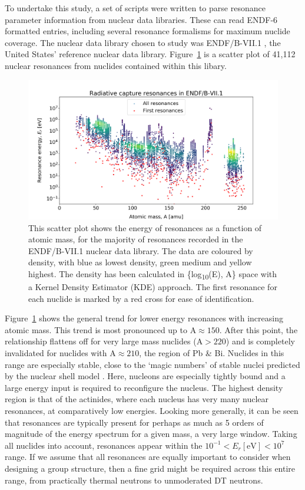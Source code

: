 To undertake this study, a set of scripts were written to parse resonance parameter information from nuclear data libraries. These can read ENDF-6 formatted entries, including several resonance formalisms for maximum nuclide coverage. The nuclear data library chosen to study was ENDF/B-VII.1 \cite{Chadwick2011}, the United States' reference nuclear data library. Figure~\ref{fig:res_energy_mass} is a scatter plot of 41,112 nuclear resonances from nuclides contained within this libary. 

\begin{figure}[H]
  \centering
  \includegraphics[width=\linewidth]{resonance_energy_atomic_mass}
  \caption{This scatter plot shows the energy of resonances as a function of atomic mass, for the majority of resonances recorded in the ENDF/B-VII.1 nuclear data library. The data are coloured by density, with blue as lowest density, green medium and yellow highest. The density has been calculated in \{log\textsubscript{10}(E), A\} space with a Kernel Density Estimator (KDE) approach. The first resonance for each nuclide is marked by a red cross for ease of identification.}
  \label{fig:res_energy_mass}
\end{figure}

Figure~\ref{fig:res_energy_mass} shows the general trend for lower energy resonances with increasing atomic mass. This trend is most pronounced up to $\mathrm{A} \approx 150$. After this point, the relationship flattens off for very large mass nuclides ($\mathrm{A} > 220$) and is completely invalidated for nuclides with $\mathrm{A} \approx 210$, the region of Pb \& Bi. Nuclides in this range are especially stable, close to the `magic numbers' of stable nuclei predicted by the nuclear shell model \cite{Stone1997}. Here, nucleons are especially tightly bound and a large energy input is required to reconfigure the nucleus. The highest density region is that of the actinides, where each nucleus has very many nuclear resonances, at comparatively low energies. Looking more generally, it can be seen that resonances are typically present for perhaps as much as 5 orders of magnitude of the energy spectrum for a given mass, a very large window. Taking all nuclides into account, resonances appear within the $10^{-1} < E_{r}\mathrm{[eV]} < 10^{7}$ range. If we assume that all resonances are equally important to consider when designing a group structure, then a fine grid might be required across this entire range, from practically thermal neutrons to unmoderated DT neutrons. 

